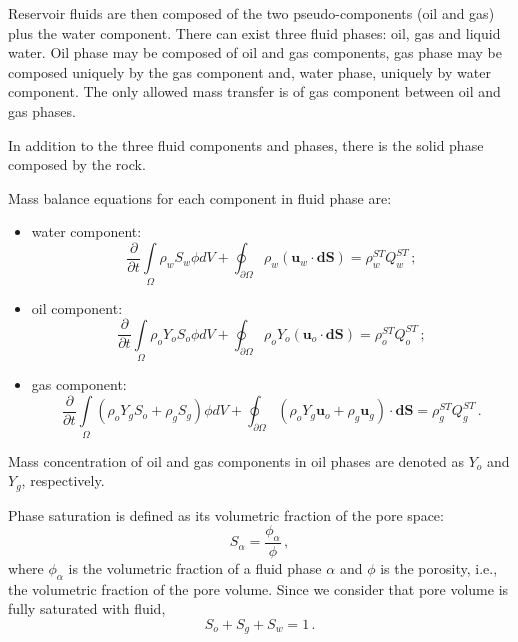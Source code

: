 \documentclass[authoryear,preprint,review,12pt]{elsarticle}
\begin{document}
Reservoir fluids are then composed of the two pseudo-components (oil and gas) plus the water component. There can exist three fluid phases: oil, gas and liquid water. Oil phase may be composed of oil and gas components, gas phase may be composed uniquely by the gas component and, water phase, uniquely by water component. The only allowed mass transfer is of gas component between oil and gas phases.

In addition to the three fluid components and phases, there is the solid phase composed by the rock.

Mass balance equations for each component in fluid phase are:

\begin{itemize}
\item water component:
\begin{equation}\label{eq: Sw1}
\frac{\partial}{\partial t} \int\limits_{\Omega} \rho_w S_w \phi dV + \oint_{\partial \Omega} \rho_w \left( \mathbf{u}_w \cdot \mathbf{dS} \right) = \rho_w^{ST}Q_w^{ST} \, ;
\end{equation}

\item oil component:
\begin{equation}\label{eq: So1}
\frac{\partial}{\partial t} \int\limits_{\Omega} \rho_o Y_o S_o \phi dV + \oint_{\partial \Omega} \rho_o Y_o \left(\mathbf{u}_o \cdot \mathbf{dS} \right)= \rho_o^{ST}Q_o^{ST} \, ;
\end{equation}

\item gas component:
\begin{equation}\label{eq: Sg1}
\frac{\partial}{\partial t} \int\limits_{\Omega} \left( \rho_o Y_g S_o + \rho_g S_g\right) \phi dV + \oint_{\partial \Omega} \left( \rho_o Y_g \mathbf{u}_o + \rho_g \mathbf{u}_g\right) \cdot \mathbf{dS}= \rho_g^{ST}Q_g^{ST} \, .
\end{equation}
\end{itemize}
Mass concentration of oil and gas components in oil phases are denoted as $Y_o$ and $Y_g$, respectively.

Phase saturation is defined as its volumetric fraction of the pore space:
\begin{equation}
S_\alpha = \frac{\phi_\alpha}{\phi} \, ,
\end{equation}
where $\phi_\alpha$ is the volumetric fraction of a fluid phase $\alpha$ and $\phi$ is the porosity, i.e., the volumetric fraction of the pore volume. Since we consider that pore volume is fully saturated with fluid,
\begin{equation}
S_o + S_g +S_w = 1 \, .
\end{equation}
\end{document}

